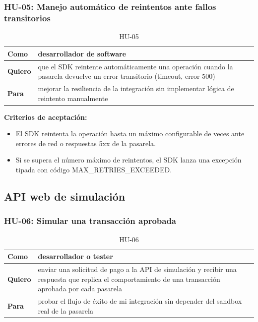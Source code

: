 \documentclass[10pt]{article}
\begin{document}
\subsubsection{HU-05: Manejo automático de reintentos ante fallos transitorios}
\begin{table}[htbp]
  \centering
  \renewcommand{\arraystretch}{1.2}
  \begin{tabularx}{\textwidth}{|l|X|}
    \hline
    \textbf{Como} & desarrollador de software \\
    \hline
    \textbf{Quiero} & que el SDK reintente automáticamente una operación cuando la pasarela devuelve un error transitorio (timeout, error 500) \\
    \hline
    \textbf{Para} & mejorar la resiliencia de la integración sin implementar lógica de reintento manualmente \\
    \hline
  \end{tabularx}
  \caption{HU-05}
  \label{tab:hu-05}
\end{table}

\textbf{Criterios de aceptación:}
\begin{itemize}
  \item El SDK reintenta la operación hasta un máximo configurable de veces ante errores de red o respuestas 5xx de la pasarela.
  \item Si se supera el número máximo de reintentos, el SDK lanza una excepción tipada con código MAX\_RETRIES\_EXCEEDED.
\end{itemize}

\subsection{API web de simulación}

\subsubsection{HU-06: Simular una transacción aprobada}
\begin{table}[htbp]
  \centering
  \renewcommand{\arraystretch}{1.2}
  \begin{tabularx}{\textwidth}{|l|X|}
    \hline
    \textbf{Como} & desarrollador o tester \\
    \hline
    \textbf{Quiero} & enviar una solicitud de pago a la API de simulación y recibir una respuesta que replica el comportamiento de una transacción aprobada por cada pasarela \\
    \hline
    \textbf{Para} & probar el flujo de éxito de mi integración sin depender del sandbox real de la pasarela \\
    \hline
  \end{tabularx}
  \caption{HU-06}
  \label{tab:hu-06}
\end{table}
\end{document}
